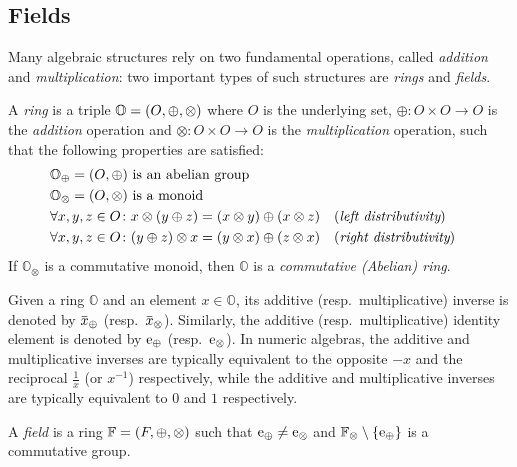 \subsection{Fields}
Many algebraic structures rely on two fundamental operations, called \emph{addition} and 
\emph{multiplication}: two important types of such structures are \emph{rings} and \emph{fields}.
\begin{definition}[Ring]
  A \emph{ring} is a triple \(\mathbb{O} = \left(O, \oplus, \otimes\right)\) where \(O\) is the 
  underlying set, \(\oplus\colon O \times O \to O\) is the \emph{addition} operation and 
  \(\otimes\colon O \times O \to O\) is the \emph{multiplication} operation, such that the 
  following properties are satisfied:
  \begin{align*}
    & \mathbb{O}_{\oplus} = \Tuple{O, \oplus}
      \textnormal{ is an abelian group} \\
    & \mathbb{O}_{\otimes} = \Tuple{O, \otimes} 
      \textnormal{ is a monoid} \\
    & \forall x,y,z \in O\colon x \otimes \Parens*{y \oplus z} = 
      \Parens*{x \otimes y} \oplus \Parens*{x \otimes z} && (\emph{left distributivity})\\
    & \forall x,y,z \in O\colon \Parens*{y \oplus z} \otimes x = 
      \Parens*{y \otimes x} \oplus \Parens*{z \otimes x} && (\emph{right distributivity})
  \end{align*}
  If \(\mathbb{O}_{\otimes}\) is a commutative monoid, then \(\mathbb{O}\) is a 
  \emph{commutative (Abelian) ring}.
\end{definition}

Given a ring \(\mathbb{O}\) and an element \(x \in \mathbb{O}\), its additive 
(resp.\ multiplicative) inverse is denoted by \(\inv{x}_{\oplus}\) (resp.\  \(\inv{x}_{\otimes}\)).
Similarly, the additive (resp.\ multiplicative) identity element is denoted by 
\(\mathrm{e}_{\oplus}\) (resp.\  \(\mathrm{e}_{\otimes}\)).
In numeric algebras, the additive and multiplicative inverses are typically equivalent to the 
opposite \(-x\) and the reciprocal \(\frac{1}{x}\) (or \(x^{-1}\)) respectively, while the additive 
and multiplicative inverses are typically equivalent to \(0\) and \(1\) respectively.

\begin{definition}[Field]
  A \emph{field} is a ring \(\mathbb{F} = \left(F, \oplus, \otimes\right)\) such that 
  \(\mathrm{e}_{\oplus} \neq \mathrm{e}_{\otimes}\) and \(\mathbb{F}_{\otimes} \setminus \left\{\mathrm{e}_{\oplus}\right\}\) 
  is a commutative group.
\end{definition}

